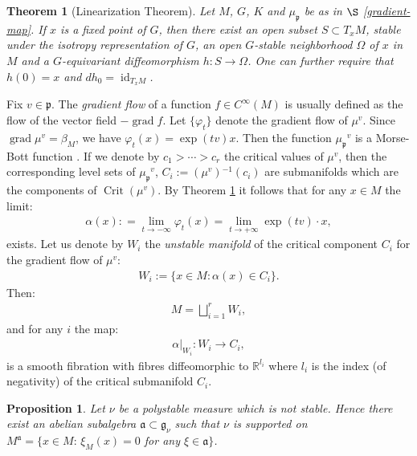 \documentclass[leqno,11pt, a4]{amsart}
\newtheorem{teo}[equation]{Theorem}
\newtheorem{prop}[equation]{Proposition}
\theoremstyle{named}
\begin{document}
\begin{teo}
  [Linearization Theorem]
  \label{line}
  Let $M$, $G$, $K$ and ${\mu_{\mathfrak{p}}}$ be as in $\S$ \ref{gradient-map}.  If $x$
  is a fixed point of $G$, then there exist an open subset
  $S \subset T_ x M$, stable under the isotropy representation of $G$,
  an open $G$-stable neighborhood $\Omega$ of $x $ in $M$ and a
  $G$-equivariant diffeomorphism $h : S {\rightarrow} \Omega$.  One can further
  require that $h(0)= x$ and $dh_0 = {\operatorname{id}}_{T_x M}$.
\end{teo}
Fix $v\in {\mathfrak{p}}$.  The \emph{gradient flow} of a function
$f\in {C^\infty} (M)$ is usually defined as the flow of the vector field
$-{\operatorname{grad}} f$.  Let $\{{\varphi}_t\}$ denote the gradient flow of
$\mu^v$. Since ${\operatorname{grad}} \mu^v =\beta_M$, we have
${\varphi}_t(x) = \exp(tv)  x$. Then the function ${\mu_{\mathfrak{p}}}^v$ is a Morse-Bott function \cite{heinzner-schwarz-Cartan,heinzner-schwarz-stoetzel,heinzner-stoetzel-global}.
If we denote by  $c_1 > {\cdots} > c_r$ the critical
  values of $\mu^v$, then the corresponding level sets of ${\mu_{\mathfrak{p}}}^v$, $C_i:=(\mu^v){^{-1}} ( c_i)$ are submanifolds which are
  the components of ${\operatorname{Crit}}(\mu^v)$. By Theorem \ref{line} it follows that for any $x\in M$ the limit:
  \begin{gather*}
    {\alpha}(x) : = \lim_{t\to -\infty} {\varphi}_t(x) = \lim_{t\to +\infty }
    \exp(t{{v}} ) {\cdot} x,
  \end{gather*}
  exists.
Let us denote by $W_i$ the \emph{unstable manifold} of the critical component $C_i$
  for the gradient flow of $\mu^v$:
  \begin{gather}
    \label{def-wu}
    W_i := \{ x\in M: {\alpha} (x) \in C_i \}.
  \end{gather}
   Then:
  \begin{gather}
    \label{scompstabile}
    M = \bigsqcup_{i=1}^r W_i,
  \end{gather}
and for any $i$ the map:
  \begin{gather*}
    {\alpha}{\vert_{{W_i}}} : W_i {\rightarrow} C_i,
  \end{gather*}
  is a smooth fibration with fibres diffeomorphic to ${\mathbb{R}}^{l_i}$ where
  ${l_i}$ is the index (of negativity) of the critical submanifold
  $C_i$.
\begin{prop}\label{mpc}
Let $\nu$ be a polystable measure which is not stable. Hence there exist an abelian subalgebra ${\mathfrak{a}}\subset {\mathfrak{g}}_\nu$ such that $\nu$ is supported on $M^{\mathfrak{a}}=\{x\in M:\, \xi_M (x)=0$ for any $\xi \in {\mathfrak{a}}\}$.
\end{prop}
\end{document}
